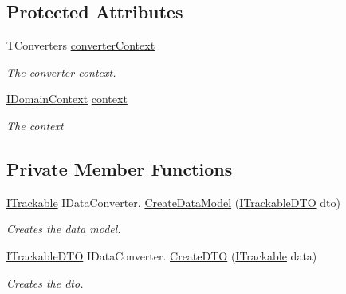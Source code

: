 \subsection*{Protected Attributes}
\begin{DoxyCompactItemize}
\item 
T\+Converters \mbox{\hyperlink{class_bar_none_1_1_shared_1_1_data_converter_1_1_core_1_1_base_data_converter_aa680c5a5e00d4330616f98e3cacffa42}{converter\+Context}}
\begin{DoxyCompactList}\small\item\em The converter context. \end{DoxyCompactList}\item 
\mbox{\hyperlink{interface_bar_none_1_1_shared_1_1_core_1_1_i_domain_context}{I\+Domain\+Context}} \mbox{\hyperlink{class_bar_none_1_1_shared_1_1_data_converter_1_1_core_1_1_base_data_converter_ae96bc28386162a9cff2a303c270a12b4}{context}}
\begin{DoxyCompactList}\small\item\em The context \end{DoxyCompactList}\end{DoxyCompactItemize}
\subsection*{Private Member Functions}
\begin{DoxyCompactItemize}
\item 
\mbox{\hyperlink{interface_bar_none_1_1_shared_1_1_core_1_1_i_trackable}{I\+Trackable}} I\+Data\+Converter. \mbox{\hyperlink{class_bar_none_1_1_shared_1_1_data_converter_1_1_core_1_1_base_data_converter_a804f60b7e9daa91b624ee16f8556b405}{Create\+Data\+Model}} (\mbox{\hyperlink{interface_bar_none_1_1_shared_1_1_core_1_1_i_trackable_d_t_o}{I\+Trackable\+D\+TO}} dto)
\begin{DoxyCompactList}\small\item\em Creates the data model. \end{DoxyCompactList}\item 
\mbox{\hyperlink{interface_bar_none_1_1_shared_1_1_core_1_1_i_trackable_d_t_o}{I\+Trackable\+D\+TO}} I\+Data\+Converter. \mbox{\hyperlink{class_bar_none_1_1_shared_1_1_data_converter_1_1_core_1_1_base_data_converter_a4ff5c2a02efd291a7a0240648328c57f}{Create\+D\+TO}} (\mbox{\hyperlink{interface_bar_none_1_1_shared_1_1_core_1_1_i_trackable}{I\+Trackable}} data)
\begin{DoxyCompactList}\small\item\em Creates the dto. \end{DoxyCompactList}\end{DoxyCompactItemize}


